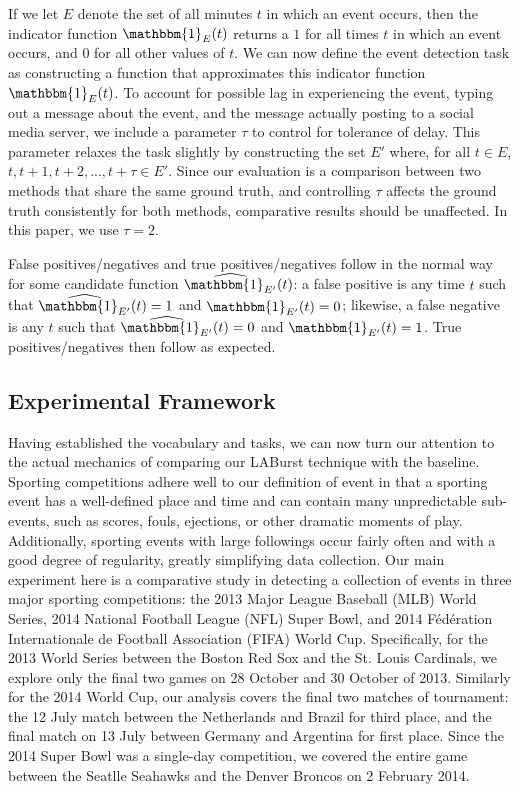 \documentclass{sig-alternate}
\begin{document}
If we let $E$ denote the set of all minutes $t$ in which an event occurs, then the indicator function $\mathbbm{1}_E(t)$ returns a $1$ for all times $t$ in which an event occurs, and $0$ for all other values of $t$. 
We can now define the event detection task as constructing a function that approximates this indicator function $\mathbbm{1}_E(t)$.
To account for possible lag in experiencing the event, typing out a message about the event, and the message actually posting to a social media server, we include a parameter $\tau$ to control for tolerance of delay.
This parameter relaxes the task slightly by constructing the set $E'$ where, for all $t \in E$, $t, t+1, t+2, ..., t+\tau \in E'$.
Since our evaluation is a comparison between two methods that share the same ground truth, and controlling $\tau$ affects the ground truth consistently for both methods, comparative results should be unaffected.
In this paper, we use $\tau=2$.

False positives/negatives and true positives/negatives follow in the normal way for some candidate function $\widehat{\mathbbm{1}_{E'}}(t)$: a false positive is any time $t$ such that $\widehat{\mathbbm{1}_{E'}}(t) = 1$ and ${\mathbbm{1}_{E'}}(t) = 0$; likewise, a false negative is any $t$ such that $\widehat{\mathbbm{1}_{E'}}(t) = 0$ and ${\mathbbm{1}_{E'}}(t) = 1$.
True positives/negatives then follow as expected.

\subsection{Experimental Framework}

Having established the vocabulary and tasks, we can now turn our attention to the actual mechanics of comparing our LABurst technique with the baseline.
Sporting competitions adhere well to our definition of event in that a sporting event has a well-defined place and time and can contain many unpredictable sub-events, such as scores, fouls, ejections, or other dramatic moments of play.
Additionally, sporting events with large followings occur fairly often and with a good degree of regularity, greatly simplifying data collection.
Our main experiment here is a comparative study in detecting a collection of events in three major sporting competitions: the 2013 Major League Baseball (MLB) World Series, 2014 National Football League (NFL) Super Bowl, and 2014 F\'{e}d\'{e}ration Internationale de Football Association (FIFA) World Cup.
Specifically, for the 2013 World Series between the Boston Red Sox and the St. Louis Cardinals, we explore only the final two games on 28 October and 30 October of 2013.
Similarly for the 2014 World Cup, our analysis covers the final two matches of tournament: the 12 July match between the Netherlands and Brazil for third place, and the final match on 13 July between Germany and Argentina for first place.
Since the 2014 Super Bowl was a single-day competition, we covered the entire game between the Seatlle Seahawks and the Denver Broncos on 2 February 2014.
\end{document}
